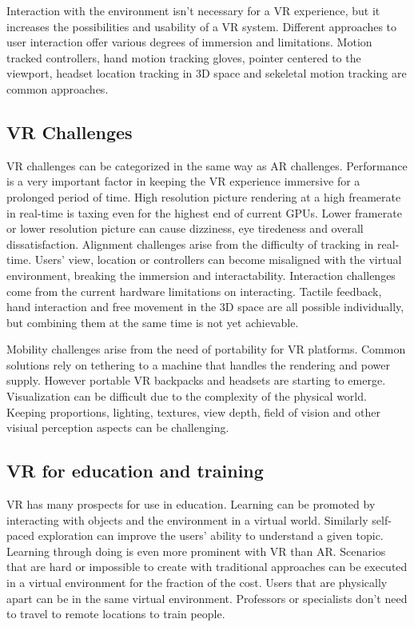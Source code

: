 \documentclass[12pt, a4paper,oneside, nocenter]{thesis}
\begin{document}
\par
Interaction with the environment isn't necessary for a VR experience, but it increases the possibilities and usability of a VR system.
Different approaches to user interaction offer various degrees of immersion and limitations. Motion tracked controllers, hand motion tracking gloves, pointer centered to the viewport, headset location tracking in 3D space and sekeletal motion tracking are common approaches.
\subsection{VR Challenges}
VR challenges can be categorized in the same way as AR challenges.
Performance is a very important factor in keeping the VR experience immersive for a prolonged period of time.
High resolution picture rendering at a high freamerate in real-time is taxing even for the highest end of current GPUs. 
Lower framerate or lower resolution picture can cause dizziness, eye tiredeness and overall dissatisfaction. Alignment challenges arise from the difficulty of tracking in real-time.
Users' view, location or controllers can become misaligned with the virtual environment, breaking the immersion and interactability.
Interaction challenges come from the current hardware limitations on interacting. Tactile feedback, hand interaction and free movement in the 3D space are all possible individually, but combining them at the same time is not yet achievable.
\par %
Mobility challenges arise from the need of portability for VR platforms. Common solutions
rely on tethering to a machine that handles the rendering and power supply. However portable VR backpacks and headsets are starting to emerge\citep{hp-vrbackpack}.
Visualization can be difficult due to the complexity of the physical world. Keeping proportions, lighting, textures, view depth, field of vision and other visiual perception aspects can be challenging.
\subsection{VR for education and training}
VR has many prospects for use in education. Learning can be promoted by interacting with objects and the environment in a virtual world. 
Similarly self-paced exploration can improve the users' ability to understand a given topic.
Learning through doing is even more prominent with VR than AR. Scenarios that are hard or impossible to create with traditional approaches can be executed in a virtual environment for the fraction of the cost.
Users that are physically apart can be in the same virtual environment.
Professors or specialists don't need to travel to remote locations to train people.
\end{document}
